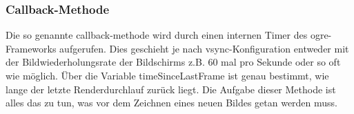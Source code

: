 \subsubsection{Callback-Methode}

Die so genannte \gls{callback-methode} wird durch einen internen Timer des \gls{ogre}-Frameworks aufgerufen. Dies geschieht je nach \gls{vsync}-Konfiguration entweder mit der Bildwiederholungsrate der Bildschirms z.B. 60 mal pro Sekunde oder so oft wie möglich. Über die Variable timeSinceLastFrame ist genau bestimmt, wie lange der letzte Renderdurchlauf zurück liegt. Die Aufgabe dieser Methode ist alles das zu tun, was vor dem Zeichnen eines neuen Bildes getan werden muss.



